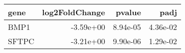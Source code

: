 \begin{tabular}{lrrr}
\toprule
 gene &  log2FoldChange &   pvalue &     padj \\
\midrule
 BMP1 &       -3.59e+00 & 8.94e-05 & 4.36e-02 \\
SFTPC &       -3.21e+00 & 9.90e-06 & 1.29e-02 \\
\bottomrule
\end{tabular}
